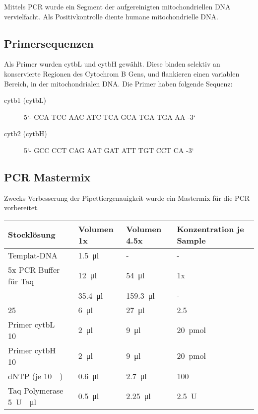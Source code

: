 \documentclass[a4paper,english]{scrreprt}
\begin{document}
Mittels PCR wurde ein Segment der aufgereinigten mitochondriellen DNA
vervielfacht. Als Positivkontrolle diente humane mitochondrielle DNA.

\subsection{Primersequenzen}

Als Primer wurden cytbL und cytbH gewählt. Diese binden selektiv an
konservierte Regionen des Cytochrom B Gens, und flankieren einen variablen
Bereich, in der mitochondrialen DNA. Die Primer haben folgende Sequenz:

\begin{description}
	\item[cytb1 (cytbL)] 5`- CCA TCC AAC ATC TCA GCA TGA TGA AA -3`
	\item[cytb2 (cytbH)] 5`- GCC CCT CAG AAT GAT ATT TGT CCT CA -3`
\end{description}

\subsection{PCR Mastermix}

Zwecks Verbesserung der Pipettiergenauigkeit wurde ein Mastermix für die PCR
vorbereitet.
\\

\begin{tabu}{llll}
	\toprule
	Stocklösung & Volumen 1x & Volumen 4.5x & Konzentration je Sample \\
	\midrule
	Templat-DNA                        & \SI{1.5}{\ul}  & -               & - \\
	5x PCR Buffer für Taq              & \SI{12}{\ul}   & \SI{54}{\ul}    & 1x \\
	                           & \SI{35.4}{\ul} & \SI{159.3}{\ul} & - \\
	 \SI{25}{\milli\Molar}   & \SI{6}{\ul}    & \SI{27}{\ul}    & \SI{2.5}{\milli\Molar} \\
	Primer cytbL \SI{10}{\micro\Molar} & \SI{2}{\ul}    & \SI{9}{\ul}     & \SI{20}{\pico\mole} \\
	Primer cytbH \SI{10}{\micro\Molar} & \SI{2}{\ul}    & \SI{9}{\ul}     & \SI{20}{\pico\mole} \\
	dNTP (je \SI{10}{\milli\Molar})    & \SI{0.6}{\ul}  & \SI{2.7}{\ul}   & \SI{100}{\micro\Molar} \\
	Taq Polymerase \SI{5}{U \per \ul}  & \SI{0.5}{\ul}  & \SI{2.25}{\ul}  & \SI{2.5}{U} \\
	\bottomrule
\end{tabu}
\\
\end{document}
